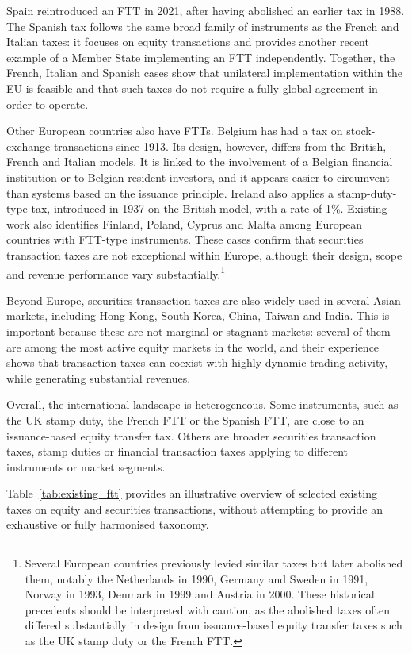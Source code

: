 \documentclass[../../main]{subfiles}
\begin{document}
Spain reintroduced an FTT in 2021, after having abolished an earlier tax in 1988. The Spanish tax follows the same broad family of instruments as the French and Italian taxes: it focuses on equity transactions and provides another recent example of a Member State implementing an FTT independently. Together, the French, Italian and Spanish cases show that unilateral implementation within the EU is feasible and that such taxes do not require a fully global agreement in order to operate.

Other European countries also have FTTs. Belgium has had a tax on stock-exchange transactions since 1913. Its design, however, differs from the British, French and Italian models. It is linked to the involvement of a Belgian financial institution or to Belgian-resident investors, and it appears easier to circumvent than systems based on the issuance principle. Ireland also applies a stamp-duty-type tax, introduced in 1937 on the British model, with a rate of 1\%. Existing work also identifies Finland, Poland, Cyprus and Malta among European countries with FTT-type instruments. These cases confirm that securities transaction taxes are not exceptional within Europe, although their design, scope and revenue performance vary substantially.\footnote{Several European countries previously levied similar taxes but later abolished them, notably the Netherlands in 1990, Germany and Sweden in 1991, Norway in 1993, Denmark in 1999 and Austria in 2000. These historical precedents should be interpreted with caution, as the abolished taxes often differed substantially in design from issuance-based equity transfer taxes such as the UK stamp duty or the French FTT.}

Beyond Europe, securities transaction taxes are also widely used in several Asian markets, including Hong Kong, South Korea, China, Taiwan and India. This is important because these are not marginal or stagnant markets: several of them are among the most active equity markets in the world, and their experience shows that transaction taxes can coexist with highly dynamic trading activity, while generating substantial revenues.

Overall, the international landscape is heterogeneous. Some instruments, such as the UK stamp duty, the French FTT or the Spanish FTT, are close to an issuance-based equity transfer tax. Others are broader securities transaction taxes, stamp duties or financial transaction taxes applying to different instruments or market segments. 

Table~\ref{tab:existing_ftt} provides an illustrative overview of selected existing taxes on equity and securities transactions, without attempting to provide an exhaustive or fully harmonised taxonomy.
\end{document}
